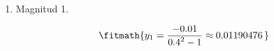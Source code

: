\begin{enumerate}

\item Magnitud 1.

\[\fitmath{y_{1}=\frac{-0.01}{{0.4}^{2}-1}\approx 0.01190476\,}\]

\end{enumerate}
